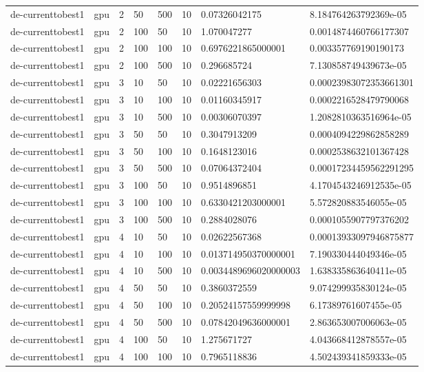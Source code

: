 \begin{table}[t]
\begin{tabular}{llllllll}
de-currenttobest1 & gpu & 2 & 50 & 500 & 10 & 0.07326042175 & 8.184764263792369e-05 \\
de-currenttobest1 & gpu & 2 & 100 & 50 & 10 & 1.070047277 & 0.0014874460766177307 \\
de-currenttobest1 & gpu & 2 & 100 & 100 & 10 & 0.6976221865000001 & 0.003357769190190173 \\
de-currenttobest1 & gpu & 2 & 100 & 500 & 10 & 0.296685724 & 7.130858749439673e-05 \\
de-currenttobest1 & gpu & 3 & 10 & 50 & 10 & 0.02221656303 & 0.00023983072353661301 \\
de-currenttobest1 & gpu & 3 & 10 & 100 & 10 & 0.01160345917 & 0.0002216528479790068 \\
de-currenttobest1 & gpu & 3 & 10 & 500 & 10 & 0.00306070397 & 1.2082810363516964e-05 \\
de-currenttobest1 & gpu & 3 & 50 & 50 & 10 & 0.3047913209 & 0.0004094229862858289 \\
de-currenttobest1 & gpu & 3 & 50 & 100 & 10 & 0.1648123016 & 0.0002538632101367428 \\
de-currenttobest1 & gpu & 3 & 50 & 500 & 10 & 0.07064372404 & 0.00017234459562291295 \\
de-currenttobest1 & gpu & 3 & 100 & 50 & 10 & 0.9514896851 & 4.1704543246912535e-05 \\
de-currenttobest1 & gpu & 3 & 100 & 100 & 10 & 0.6330421203000001 & 5.572820883546055e-05 \\
de-currenttobest1 & gpu & 3 & 100 & 500 & 10 & 0.2884028076 & 0.0001055907797376202 \\
de-currenttobest1 & gpu & 4 & 10 & 50 & 10 & 0.02622567368 & 0.00013933097946875877 \\
de-currenttobest1 & gpu & 4 & 10 & 100 & 10 & 0.013714950370000001 & 7.190330444049346e-05 \\
de-currenttobest1 & gpu & 4 & 10 & 500 & 10 & 0.0034489696020000003 & 1.638335863640411e-05 \\
de-currenttobest1 & gpu & 4 & 50 & 50 & 10 & 0.3860372559 & 9.074299935830124e-05 \\
de-currenttobest1 & gpu & 4 & 50 & 100 & 10 & 0.20524157559999998 & 6.17389761607455e-05 \\
de-currenttobest1 & gpu & 4 & 50 & 500 & 10 & 0.07842049636000001 & 2.863653007006063e-05 \\
de-currenttobest1 & gpu & 4 & 100 & 50 & 10 & 1.275671727 & 4.043668412878557e-05 \\
de-currenttobest1 & gpu & 4 & 100 & 100 & 10 & 0.7965118836 & 4.502439341859333e-05 \\

\end{tabular}
\end{table}
